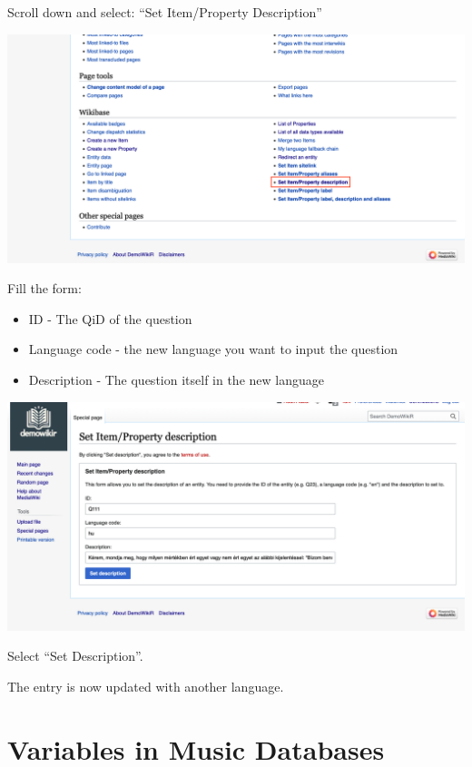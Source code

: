 \documentclass[
  letterpaper,
  DIV=11,
  numbers=noendperiod]{scrreprt}
\begin{document}
Scroll down and select: ``Set Item/Property Description''

\begin{center}
\includegraphics{png/question_to_wikibase/SpecialPages_Set_ItemProperty_Description_2x1.png}
\end{center}

Fill the form:

\begin{itemize}
\item
  ID - The QiD of the question
\item
  Language code - the new language you want to input the question
\item
  Description - The question itself in the new language
\end{itemize}

\begin{center}
\includegraphics{png/question_to_wikibase/Set_IetmProperty_Description_2x1.png}
\end{center}
Select ``Set Description''.

The entry is now updated with another language.

\chapter{Variables in Music Databases}\label{sec-musicapi}
\end{document}
